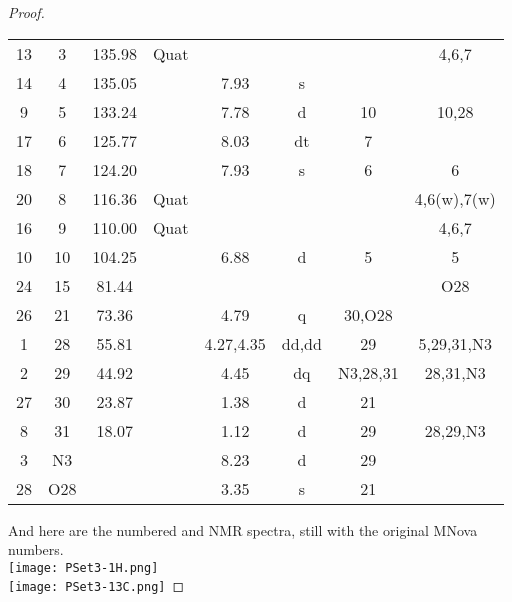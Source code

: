 \documentclass[../psets.tex]{subfiles}
\begin{document}
\begin{proof}
\begin{center}
\begin{tabular}{|c|c|S|c|c|c|c|c|}
            13 & 3   & 135.98 & Quat     &           &       &          & 4,6,7\\
            14 & 4   & 135.05 &          & 7.93      & s     &          & \\
            9  & 5   & 133.24 &          & 7.78      & d     & 10       & 10,28\\
            17 & 6   & 125.77 &          & 8.03      & dt    & 7        & \\
            18 & 7   & 124.20 &          & 7.93      & s     & 6        & 6\\
            20 & 8   & 116.36 & Quat     &           &       &          & 4,6(w),7(w)\\
            16 & 9   & 110.00 & Quat     &           &       &          & 4,6,7\\
            10 & 10  & 104.25 &          & 6.88      & d     & 5        & 5\\
            24 & 15  & 81.44  &          &           &       &          & O28\\
            26 & 21  & 73.36  &          & 4.79      & q     & 30,O28   & \\
            1  & 28  & 55.81  &  & 4.27,4.35 & dd,dd & 29       & 5,29,31,N3\\
            2  & 29  & 44.92  &          & 4.45      & dq    & N3,28,31 & 28,31,N3\\
            27 & 30  & 23.87  &          & 1.38      & d     & 21       & \\
            8  & 31  & 18.07  &          & 1.12      & d     & 29       & 28,29,N3\\
            3  & N3  &        &          & 8.23      & d     & 29       & \\
            28 & O28 &        &          & 3.35      & s     & 21       & \\
            \bottomrule
        \end{tabular}
    \end{center}
    And here are the numbered  and  NMR spectra, still with the original MNova numbers.\\
    \texttt{[image: PSet3-1H.png]}\\
    \texttt{[image: PSet3-13C.png]}

\end{proof}
\end{document}
